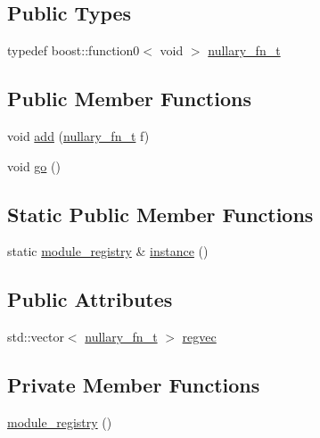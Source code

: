 \subsection*{Public Types}
\begin{DoxyCompactItemize}
\item 
typedef boost\-::function0$<$ void $>$ \hyperlink{structecto_1_1registry_1_1module__registry_a90fc28cbb13d6662b0b8d898985be04e}{nullary\-\_\-fn\-\_\-t}
\end{DoxyCompactItemize}
\subsection*{Public Member Functions}
\begin{DoxyCompactItemize}
\item 
void \hyperlink{structecto_1_1registry_1_1module__registry_aef2549c7e8d6840420041f2231dcdebf}{add} (\hyperlink{structecto_1_1registry_1_1module__registry_a90fc28cbb13d6662b0b8d898985be04e}{nullary\-\_\-fn\-\_\-t} f)
\item 
void \hyperlink{structecto_1_1registry_1_1module__registry_ab8a2255326e085adc04ad180aa1752ec}{go} ()
\end{DoxyCompactItemize}
\subsection*{Static Public Member Functions}
\begin{DoxyCompactItemize}
\item 
static \hyperlink{structecto_1_1registry_1_1module__registry}{module\-\_\-registry} \& \hyperlink{structecto_1_1registry_1_1module__registry_ac968548cf0e11339bf002828e67b857f}{instance} ()
\end{DoxyCompactItemize}
\subsection*{Public Attributes}
\begin{DoxyCompactItemize}
\item 
std\-::vector$<$ \hyperlink{structecto_1_1registry_1_1module__registry_a90fc28cbb13d6662b0b8d898985be04e}{nullary\-\_\-fn\-\_\-t} $>$ \hyperlink{structecto_1_1registry_1_1module__registry_a77ae3e886433428c82d5dbb8039d53f6}{regvec}
\end{DoxyCompactItemize}
\subsection*{Private Member Functions}
\begin{DoxyCompactItemize}
\item 
\hyperlink{structecto_1_1registry_1_1module__registry_aef45ef0e61d967ea203db086f8aa9f65}{module\-\_\-registry} ()
\end{DoxyCompactItemize}


